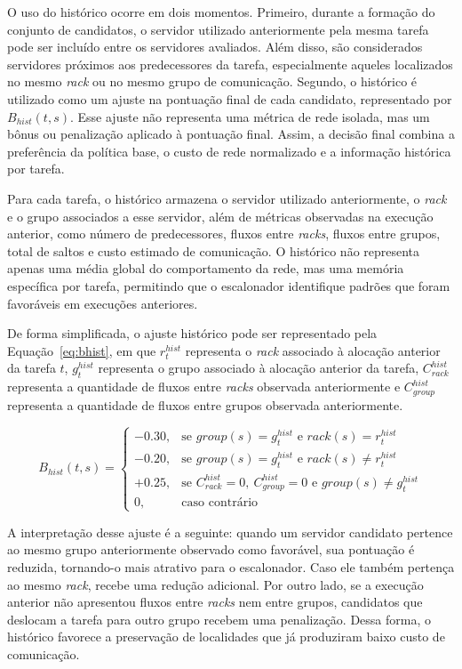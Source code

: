 \documentclass[12pt]{article}
\begin{document}
O uso do histórico ocorre em dois momentos. 
%
Primeiro, durante a formação do conjunto de candidatos, o servidor utilizado anteriormente pela mesma tarefa pode ser incluído entre os servidores avaliados.
%
Além disso, são considerados servidores próximos aos predecessores da tarefa, especialmente aqueles localizados no mesmo \textit{rack} ou no mesmo grupo de comunicação. 
%
Segundo, o histórico é utilizado como um ajuste na pontuação final de cada candidato, representado por $B_{hist}(t,s)$.
%
Esse ajuste não representa uma métrica de rede isolada, mas um bônus ou penalização aplicado à pontuação final. 
%
Assim, a decisão final combina a preferência da política base, o custo de rede normalizado e a informação histórica por tarefa.

Para cada tarefa, o histórico armazena o servidor utilizado anteriormente, o \textit{rack} e o grupo associados a esse servidor, além de métricas observadas na execução anterior, como número de predecessores, fluxos entre \textit{racks}, fluxos entre grupos, total de saltos e custo estimado de comunicação. 
%
O histórico não representa apenas uma média global do comportamento da rede, mas uma memória específica por tarefa, permitindo que o escalonador identifique padrões que foram favoráveis em execuções anteriores.

De forma simplificada, o ajuste histórico pode ser representado pela Equação~\ref{eq:bhist}, em que $r_t^{hist}$ representa o \textit{rack} associado à alocação anterior da tarefa $t$, $g_t^{hist}$ representa o grupo associado à alocação anterior da tarefa, $C_{rack}^{hist}$ representa a quantidade de fluxos entre \textit{racks} observada anteriormente e $C_{group}^{hist}$ representa a quantidade de fluxos entre grupos observada anteriormente.

\begin{equation}
B_{hist}(t,s) =
\begin{cases}
-0.30, & \text{se } group(s)=g_t^{hist} \text{ e } rack(s)=r_t^{hist} \\
-0.20, & \text{se } group(s)=g_t^{hist} \text{ e } rack(s)\neq r_t^{hist} \\
+0.25, & \text{se } C_{rack}^{hist}=0,\ C_{group}^{hist}=0 \text{ e } group(s)\neq g_t^{hist} \\
0, & \text{caso contrário}
\end{cases}
\label{eq:bhist}
\end{equation}

A interpretação desse ajuste é a seguinte: quando um servidor candidato pertence ao mesmo grupo anteriormente observado como favorável, sua pontuação é reduzida, tornando-o mais atrativo para o escalonador. Caso ele também pertença ao mesmo \textit{rack}, recebe uma redução adicional. Por outro lado, se a execução anterior não apresentou fluxos entre \textit{racks} nem entre grupos, candidatos que deslocam a tarefa para outro grupo recebem uma penalização. Dessa forma, o histórico favorece a preservação de localidades que já produziram baixo custo de comunicação.
\end{document}
